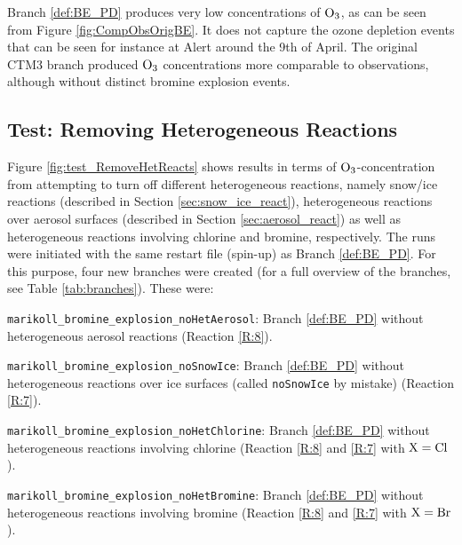 \medskip

Branch \ref{def:BE_PD} produces very low concentrations of $\mathrm{O_3}$, as can be seen from Figure \ref{fig:CompObsOrigBE}. It does not capture the ozone depletion events that can be seen for instance at Alert around the 9th of April. The original CTM3 branch produced $\mathrm{O_3}$ concentrations more comparable to observations, although without distinct bromine explosion events. 





\subsection{Test: Removing Heterogeneous Reactions}

Figure \ref{fig:test_RemoveHetReacts} shows results in terms of $\mathrm{O_3}$-concentration from attempting to turn off different heterogeneous reactions, namely snow/ice reactions (described in Section \ref{sec:snow_ice_react}), heterogeneous reactions over aerosol surfaces (described in Section \ref{sec:aerosol_react}) as well as heterogeneous reactions involving chlorine and bromine, respectively. The runs were initiated with the same restart file (spin-up) as Branch \ref{def:BE_PD}. For this purpose, four new branches were created (for a full overview of the branches, see Table \ref{tab:branches}). These were:

\begin{mydef}\label{def:BE_PD_noAerosol}
    \texttt{marikoll\_bromine\_explosion\_noHetAerosol}: Branch \ref{def:BE_PD} without heterogeneous aerosol reactions (Reaction \ref{R:8}). 
\end{mydef}

\begin{mydef}\label{def:BE_PD_noIce}
    \texttt{marikoll\_bromine\_explosion\_noSnowIce}: Branch \ref{def:BE_PD} without heterogeneous reactions over ice surfaces (called \texttt{noSnowIce} by mistake) (Reaction \ref{R:7}).
\end{mydef}

\begin{mydef}\label{def:BE_PD_noCl}
    \texttt{marikoll\_bromine\_explosion\_noHetChlorine}: Branch \ref{def:BE_PD} without heterogeneous reactions involving chlorine (Reaction \ref{R:8} and \ref{R:7} with $\mathrm{X} = \mathrm{Cl}$).
\end{mydef}

\begin{mydef}\label{def:BE_PD_noBr}
    \texttt{marikoll\_bromine\_explosion\_noHetBromine}: Branch \ref{def:BE_PD} without heterogeneous reactions involving bromine (Reaction \ref{R:8} and \ref{R:7} with $\mathrm{X} = \mathrm{Br}$).
\end{mydef}


